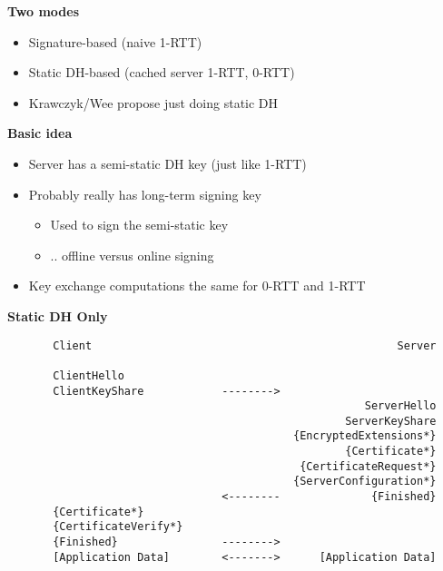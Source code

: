 \documentclass[helvetica]{seminar}
\newcommand{\heading}[1]{%
  \begin{center} 
    \large\bf 
    #1 
  \end{center} 
  \vspace{.4 in}}
\begin{document}
\begin{slide}
\heading{Two modes}

\begin{itemize}
\item Signature-based (naive 1-RTT)
\item Static DH-based (cached server 1-RTT, 0-RTT)
\item Krawczyk/Wee propose just doing static DH
\end{itemize}
\end{slide}


\begin{slide}
\heading{Basic idea}

\begin{itemize}
\item Server has a semi-static DH key (just like 1-RTT)
\item Probably really has long-term signing key
  \begin{itemize}
  \item Used to sign the semi-static key
  \item .. offline versus online signing
  \end{itemize}

\item Key exchange computations the same for 0-RTT and 1-RTT
\end{itemize}

\end{slide}


\begin{slide}
\heading{Static DH Only}

{\scriptsize
\begin{verbatim}
       Client                                               Server

       ClientHello
       ClientKeyShare            -------->
                                                       ServerHello
                                                    ServerKeyShare
                                            {EncryptedExtensions*}
                                                    {Certificate*}
                                             {CertificateRequest*}
                                            {ServerConfiguration*}
                                 <--------              {Finished}
       {Certificate*}
       {CertificateVerify*}
       {Finished}                -------->
       [Application Data]        <------->      [Application Data]
\end{verbatim}
}
\end{slide}
\end{document}
